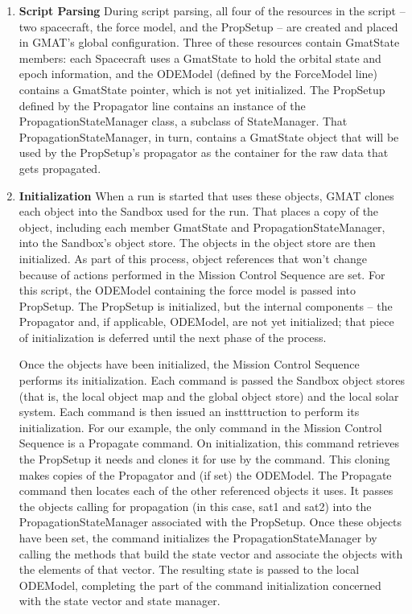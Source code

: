 \begin{enumerate}
\item \textbf{Script Parsing}  During script parsing, all four of the resources in the script --
two spacecraft, the force model, and the PropSetup -- are created and placed in GMAT's global
configuration.  Three of these resources contain GmatState members: each Spacecraft uses a
GmatState to hold the orbital state and epoch information, and the ODEModel (defined by the
ForceModel line) contains a GmatState pointer, which is not yet initialized.  The PropSetup defined
by the Propagator line contains an instance of the PropagationStateManager class, a subclass of
StateManager.  That PropagationStateManager, in turn, contains a GmatState object that will be used
by the PropSetup's propagator as the container for the raw data that gets propagated.

\item \textbf{Initialization}  When a run is started that uses these objects, GMAT clones each
object into the Sandbox used for the run.  That places a copy of the object, including each member
GmatState and PropagationStateManager, into the Sandbox's object store.  The objects in the object
store are then initialized.  As part of this process, object references that won't change because
of actions performed in the Mission Control Sequence are set.  For this script, the ODEModel
containing the force model is passed into PropSetup.  The PropSetup is initialized, but the
internal components -- the Propagator and, if applicable, ODEModel, are not yet initialized; that
piece of initialization is deferred until the next phase of the process.

Once the objects have been initialized, the Mission Control Sequence performs its initialization.
Each command is passed the Sandbox object stores (that is, the local object map and the global
object store) and the local solar system.  Each command is then issued an instttruction to perform
its initialization.  For our example, the only command in the Mission Control Sequence is a
Propagate command.  On initialization, this command retrieves the PropSetup it needs and clones it
for use by the command.  This cloning makes copies of the Propagator and (if set) the ODEModel.
The Propagate command then locates each of the other referenced objects it uses.  It passes the
objects calling for propagation (in this case, sat1 and sat2) into the PropagationStateManager
associated with the PropSetup.  Once these objects have been set, the command initializes the
PropagationStateManager by calling the methods that build the state vector and associate the
objects with the elements of that vector.  The resulting state is passed to the local ODEModel,
completing the part of the command initialization concerned with the state vector and state manager.


\end{enumerate}
